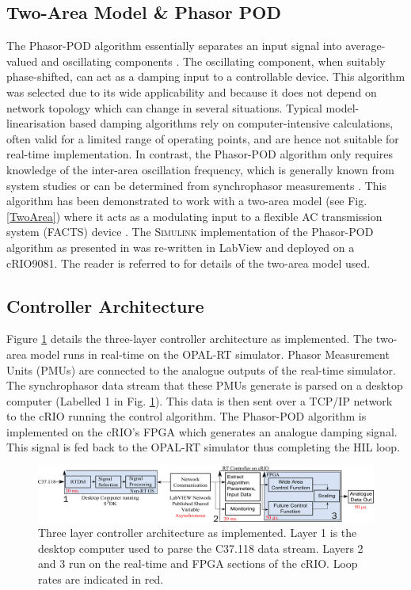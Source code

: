\documentclass[conference]{IEEEtran}
\begin{document}
\subsection{Two-Area Model \& Phasor POD}
The Phasor-POD algorithm essentially separates an input signal into average-valued and oscillating components \cite{PhasorPOD}. The oscillating component, when suitably phase-shifted, can act as a damping input to a controllable device. This algorithm\cite{PhasorPOD} was selected due to its wide applicability and because it does not depend on network topology which can change in several situations. Typical model-linearisation based damping algorithms rely on computer-intensive calculations, often valid for a limited range of operating points, and are hence not suitable for real-time implementation. In contrast, the Phasor-POD algorithm only requires knowledge of the inter-area oscillation frequency, which is generally known from system studies or can be determined from synchrophasor measurements \cite{TaskForce}. This algorithm has been demonstrated to work with a two-area model (see Fig. \ref{TwoArea}) where it acts as a modulating input to a flexible AC transmission system (FACTS) device \cite{PhasorPODImplement}. The \textsc{Simulink} implementation of the Phasor-POD algorithm as presented in \cite{PhasorPODImplement} was re-written in LabView and deployed on a cRIO9081. The reader is referred to \cite{KundurTwoArea} for details of the two-area model used.

\subsection{Controller Architecture}
Figure \ref{FinalArch} details the three-layer controller architecture as implemented. The two-area model runs in real-time on the OPAL-RT simulator. Phasor Measurement Units (PMUs) are connected to the analogue outputs of the real-time simulator. The synchrophasor data stream that these PMUs generate is parsed on a desktop computer (Labelled 1 in Fig. \ref{FinalArch}). This data is then sent over a TCP/IP network to the cRIO running the control algorithm. The Phasor-POD algorithm is implemented on the cRIO's FPGA which generates an analogue damping signal. This signal is fed back to the OPAL-RT simulator thus completing the HIL loop.

\begin{figure}[th]
\centering
\includegraphics[width=6in]{ArchitectureDevelopment.pdf} 
\caption{Three layer controller architecture as implemented. Layer 1 is the desktop computer used to parse the C37.118 data stream. Layers 2 and 3 run on the real-time and FPGA sections of the cRIO. Loop rates are
	indicated in red.}
\label{FinalArch}
\end{figure}
\end{document}
